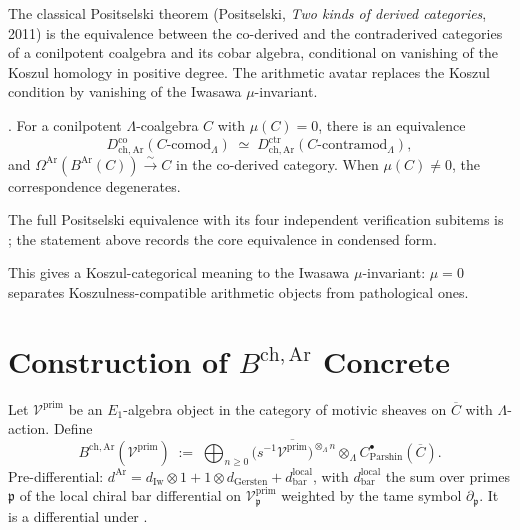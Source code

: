 The classical Positselski theorem (Positselski, \emph{Two kinds of
derived categories}, 2011) is the equivalence between the co-derived
and the contraderived categories of a conilpotent coalgebra and its
cobar algebra, conditional on vanishing of the Koszul homology in
positive degree. The arithmetic avatar replaces the Koszul condition
by vanishing of the Iwasawa \(\mu\)-invariant.

\begin{theorem}
\label{v4-arith:thm:arithmetic-positselski-preview}
\ClaimStatusConjectured. For a conilpotent \(\Lambda\)-coalgebra
\(C\) with \(\mu(C)=0\), there is an equivalence
\begin{equation}
D^{\mathrm{co}}_{\mathrm{ch,Ar}}(C\text{-comod}_{\Lambda})\;\simeq\;D^{\mathrm{ctr}}_{\mathrm{ch,Ar}}(C\text{-contramod}_{\Lambda}),
\end{equation}
and \(\Omega^{\mathrm{Ar}}(B^{\mathrm{Ar}}(C))\xrightarrow{\sim}C\)
in the co-derived category. When \(\mu(C)\neq 0\), the
correspondence degenerates.
\end{theorem}

The full Positselski equivalence with its four independent
verification subitems is ;
the statement above records the core equivalence in condensed form.

\begin{remark}
This gives a Koszul-categorical meaning to the Iwasawa
\(\mu\)-invariant: \(\mu=0\) separates Koszulness-compatible
arithmetic objects from pathological ones.
\end{remark}

\section{Construction of \(B^{\mathrm{ch,Ar}}\) Concrete}
\label{v4-arith:bar:concrete-construction}

\begin{definition}
\label{v4-arith:def:arith-bar-concrete}
Let \(\mathcal{V}^{\mathrm{prim}}\) be an \(E_{1}\)-algebra object in
the category of motivic sheaves on \(\overline{C}\) with
\(\Lambda\)-action. Define
\begin{equation}
B^{\mathrm{ch,Ar}}(\mathcal{V}^{\mathrm{prim}})\;:=\;\bigoplus_{n\geq 0}\bigl(s^{-1}\overline{\mathcal{V}^{\mathrm{prim}}}\bigr)^{\otimes_{\Lambda}n}\otimes_{\Lambda}C^{\bullet}_{\mathrm{Parshin}}(\overline{C}).
\end{equation}
Pre-differential:
\(d^{\mathrm{Ar}}=d_{\mathrm{Iw}}\otimes 1+1\otimes d_{\mathrm{Gersten}}+d_{\mathrm{bar}}^{\mathrm{local}}\),
with \(d_{\mathrm{bar}}^{\mathrm{local}}\) the sum over primes
\(\mathfrak{p}\) of the local chiral bar differential on
\(\mathcal{V}^{\mathrm{prim}}_{\mathfrak{p}}\) weighted by the tame
symbol \(\partial_{\mathfrak{p}}\). It is a differential under
.
\end{definition}

